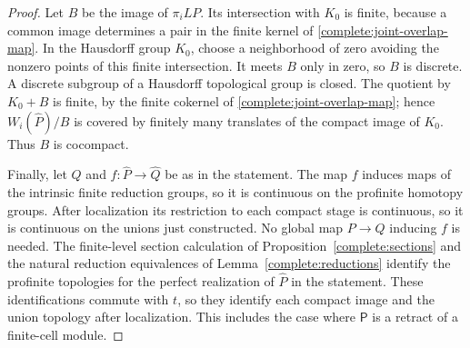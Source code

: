\begin{proof}
Let $B$ be the image of $\pi_iLP$. Its intersection with $K_0$ is
finite, because a common image determines a pair in the finite
kernel of \eqref{complete:joint-overlap-map}. In the Hausdorff
group $K_0$, choose a neighborhood of zero avoiding the nonzero
points of this finite intersection. It meets $B$ only in zero,
so $B$ is discrete. A discrete subgroup of a Hausdorff topological
group is closed. The quotient by $K_0+B$ is finite, by the
finite cokernel of \eqref{complete:joint-overlap-map}; hence
$W_i(\widehat P)/B$ is covered by finitely many translates of the
compact image of $K_0$. Thus $B$ is cocompact.

Finally, let $Q$ and $f:\widehat P\to\widehat Q$ be as in the
statement. The map $f$ induces maps of the intrinsic finite reduction
groups, so it is continuous on the profinite homotopy groups. After
localization its restriction to each compact stage is continuous, so it
is continuous on the unions just constructed. No global map $P\to Q$
inducing $f$ is needed. The finite-level section calculation of
Proposition~\ref{complete:sections} and the natural reduction equivalences
of Lemma~\ref{complete:reductions} identify the profinite topologies for
the perfect realization of $\widehat P$ in the statement. These
identifications commute with $t$, so they identify each compact image and
the union topology after localization. This includes the case where
$\mathsf P$ is a retract of a finite-cell module.
\end{proof}
